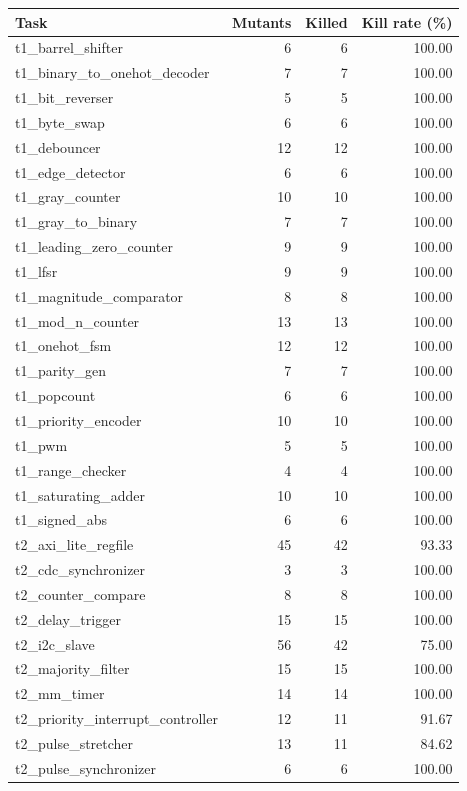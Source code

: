 \begin{tabular}{lrrr}
\toprule
Task & Mutants & Killed & Kill rate (\%) \\
\midrule
t1\_barrel\_shifter & 6 & 6 & 100.00 \\
t1\_binary\_to\_onehot\_decoder & 7 & 7 & 100.00 \\
t1\_bit\_reverser & 5 & 5 & 100.00 \\
t1\_byte\_swap & 6 & 6 & 100.00 \\
t1\_debouncer & 12 & 12 & 100.00 \\
t1\_edge\_detector & 6 & 6 & 100.00 \\
t1\_gray\_counter & 10 & 10 & 100.00 \\
t1\_gray\_to\_binary & 7 & 7 & 100.00 \\
t1\_leading\_zero\_counter & 9 & 9 & 100.00 \\
t1\_lfsr & 9 & 9 & 100.00 \\
t1\_magnitude\_comparator & 8 & 8 & 100.00 \\
t1\_mod\_n\_counter & 13 & 13 & 100.00 \\
t1\_onehot\_fsm & 12 & 12 & 100.00 \\
t1\_parity\_gen & 7 & 7 & 100.00 \\
t1\_popcount & 6 & 6 & 100.00 \\
t1\_priority\_encoder & 10 & 10 & 100.00 \\
t1\_pwm & 5 & 5 & 100.00 \\
t1\_range\_checker & 4 & 4 & 100.00 \\
t1\_saturating\_adder & 10 & 10 & 100.00 \\
t1\_signed\_abs & 6 & 6 & 100.00 \\
t2\_axi\_lite\_regfile & 45 & 42 & 93.33 \\
t2\_cdc\_synchronizer & 3 & 3 & 100.00 \\
t2\_counter\_compare & 8 & 8 & 100.00 \\
t2\_delay\_trigger & 15 & 15 & 100.00 \\
t2\_i2c\_slave & 56 & 42 & 75.00 \\
t2\_majority\_filter & 15 & 15 & 100.00 \\
t2\_mm\_timer & 14 & 14 & 100.00 \\
t2\_priority\_interrupt\_controller & 12 & 11 & 91.67 \\
t2\_pulse\_stretcher & 13 & 11 & 84.62 \\
t2\_pulse\_synchronizer & 6 & 6 & 100.00 \\

\end{tabular}
